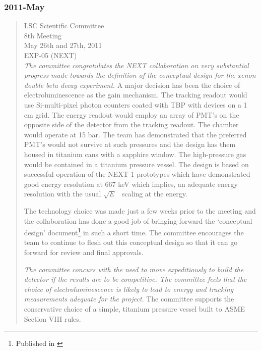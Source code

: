 \subsubsection*{2011-May}
\begin{quotation}
LSC Scientific Committee \\
8th Meeting \\
May 26th and 27th, 2011 \\
EXP-05 (NEXT)\\

{\em The committee congratulates the NEXT collaboration on very substantial progress made towards the definition of the conceptual design for the xenon double beta decay experiment}. A major decision has been the choice of electroluminescence as the gain mechanism. The tracking readout would use Si-multi-pixel photon counters coated with TBP with devices on a 1 cm grid. The energy readout would employ an array of PMT’s on the opposite side of the detector from the tracking readout. The chamber would operate at 15 bar. The team has demonstrated that the preferred PMT’s would not survive at such pressures and the design has them housed in titanium cans with a sapphire window. The high-pressure gas would be contained in a titanium pressure vessel. The design is based on successful operation of the NEXT-1 prototypes which have demonstrated good energy resolution at 667 keV which implies, an adequate energy resolution with the usual $\sqrt{E}$~ scaling at the \Qbb energy.
 
The technology choice was made just a few weeks prior to the meeting and the collaboration has done a good job of bringing forward the ‘conceptual design’ document\footnote{Published in \cite{Alvarez:2011my}} in such a short time. The committee encourages the team to continue to flesh out this conceptual design so that it can go forward for review and final approvals. 
 
{\em The committee concurs with the need to move expeditiously to build the detector if the results are to be competitive. The committee feels that the choice of electroluminescence is likely to lead to energy and tracking measurements adequate for the project}. The committee supports the conservative choice of a simple, titanium pressure vessel built to ASME Section VIII rules.
 

\end{quotation}
